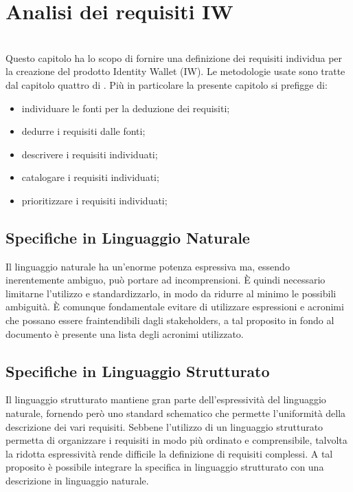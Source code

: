 
\chapter{Analisi dei requisiti IW}
\label{cap:analisi-requisiti}

\\
Questo capitolo ha lo scopo di fornire una definizione dei requisiti individua per la creazione del prodotto Identity Wallet (IW). Le metodologie usate sono tratte dal capitolo quattro di \cite{som:swe}.
Più in particolare la presente capitolo si prefigge di: 
\begin{itemize}
    \item individuare le fonti per la deduzione dei requisiti; 
    \item dedurre i requisiti dalle fonti; 
    \item descrivere i requisiti individuati; 
    \item catalogare i requisiti individuati; 
    \item prioritizzare i requisiti individuati;
\end{itemize}
\section{Specifiche in Linguaggio Naturale}
Il linguaggio naturale ha un’enorme potenza espressiva ma, essendo inerentemente ambiguo, può portare ad incomprensioni. È quindi necessario limitarne l’utilizzo e standardizzarlo, in modo da ridurre al minimo le possibili ambiguità. È comunque fondamentale evitare di utilizzare espressioni e acronimi che possano essere fraintendibili dagli stakeholders, a tal proposito in fondo al documento è presente una lista degli acronimi utilizzato.
\section{Specifiche in Linguaggio Strutturato}
Il linguaggio strutturato mantiene gran parte dell’espressività del linguaggio naturale, fornendo però uno standard schematico che permette l’uniformità della descrizione dei vari requisiti. Sebbene l’utilizzo di un linguaggio strutturato permetta di organizzare i requisiti in modo più ordinato e comprensibile, talvolta la ridotta espressività rende difficile la definizione di requisiti complessi. A tal proposito è possibile integrare la specifica in linguaggio strutturato con una descrizione in linguaggio naturale.
